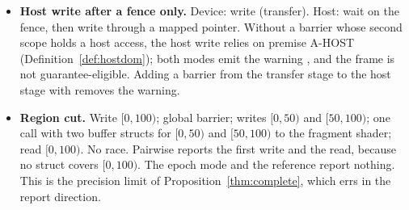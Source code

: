\begin{itemize}
  color-attachment write, and a color-attachment write of $A$ (token $\pi$). The local link orders the input read
  before the write, but not the sampled read, which has no token, so the sampled read and the write race. If the two
  reads shared an epoch read key, the input read would stand in for the sampled read and the race would be missed.
  The read key and  include the token (, line~10), so both modes and the reference report
  the race, whether or not the two reads come from one command.
\item \textbf{Host write after a fence only.} Device: write  (transfer). Host: wait on the fence, then
  write  through a mapped pointer. Without a barrier whose second scope holds a host access, the host write
  relies on premise A-HOST (Definition~\ref{def:hostdom}); both modes emit the warning
  , and the frame is not guarantee-eligible. Adding a barrier from the transfer
  stage to the host stage with  removes the warning.
\item \textbf{Region cut.} Write $[0,100)$; global barrier; writes $[0,50)$ and $[50,100)$; one call with two buffer
  structs for $[0,50)$ and $[50,100)$ to the fragment shader; read $[0,100)$. No race. Pairwise reports the first
  write and the read, because no struct covers $[0,100)$. The epoch mode and the reference report nothing. This is the
  precision limit of Proposition~\ref{thm:complete}, which errs in the report direction.
\end{itemize}
